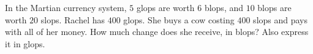 In the Martian currency system, $5$ glops are worth $6$ blops, and $10$ blops are worth $20$ slops. Rachel has $400$ glops. She buys a cow costing $400$ slops and pays with all of her money. How much change does she receive, in blops? Also express it in glops.
